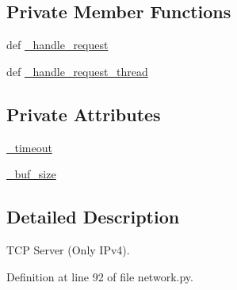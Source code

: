 \subsection*{Private Member Functions}
\begin{DoxyCompactItemize}
\item 
def \hyperlink{class__cookbook_1_1network_1_1MyTCPServer_ac8ca922bd2e669878ef773369fd59f1b}{\-\_\-handle\-\_\-request}
\item 
def \hyperlink{class__cookbook_1_1network_1_1MyTCPServer_a34045163ccbcbe1df6787ccccdf5ccd4}{\-\_\-handle\-\_\-request\-\_\-thread}
\end{DoxyCompactItemize}
\subsection*{Private Attributes}
\begin{DoxyCompactItemize}
\item 
\hyperlink{class__cookbook_1_1network_1_1MyTCPServer_a2d426a06d0a3da094c8034f7fc01d418}{\-\_\-timeout}
\item 
\hyperlink{class__cookbook_1_1network_1_1MyTCPServer_a5de848477fbd96d57b18d29761a86b9e}{\-\_\-buf\-\_\-size}
\end{DoxyCompactItemize}


\subsection{Detailed Description}
\begin{DoxyVerb}TCP Server (Only IPv4).
\end{DoxyVerb}
 

Definition at line 92 of file network.\-py.




